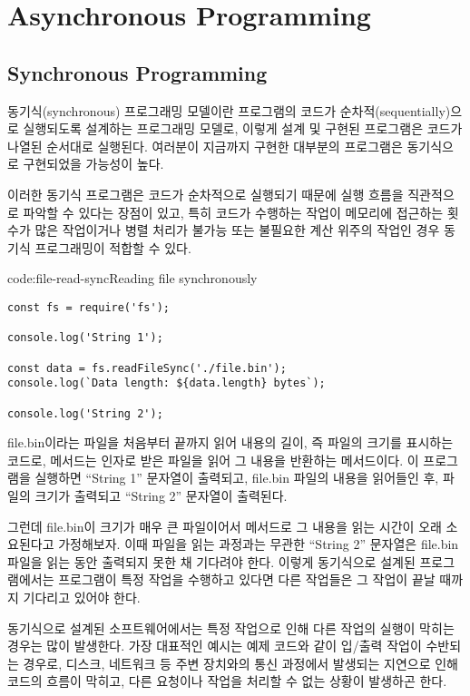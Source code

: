 \section{Asynchronous Programming}\label{sect:async-programming}

\subsection*{Synchronous Programming}

동기식(synchronous) 프로그래밍 모델이란 프로그램의 코드가 순차적(sequentially)으로 실행되도록 설계하는 프로그래밍 모델로, 이렇게 설계 및 구현된 프로그램은 코드가 나열된 순서대로 실행된다. 여러분이 지금까지 구현한 대부분의 프로그램은 동기식으로 구현되었을 가능성이 높다.

이러한 동기식 프로그램은 코드가 순차적으로 실행되기 때문에 실행 흐름을 직관적으로 파악할 수 있다는 장점이 있고, 특히 코드가 수행하는 작업이 메모리에 접근하는 횟수가 많은 작업이거나 병렬 처리가 불가능 또는 불필요한 계산 위주의 작업인 경우 동기식 프로그래밍이 적합할 수 있다.

\begin{code}{code:file-read-sync}{Reading file synchronously}
\begin{verbatim}
const fs = require('fs');

console.log('String 1');

const data = fs.readFileSync('./file.bin');
console.log(`Data length: ${data.length} bytes`);

console.log('String 2');
\end{verbatim}
\end{code}

\는 file.bin이라는 파일을 처음부터 끝까지 읽어 내용의 길이, 즉 파일의 크기를 표시하는 코드로,  메서드는 인자로 받은 파일을 읽어 그 내용을 반환하는 메서드이다. 이 프로그램을 실행하면 ``String 1'' 문자열이 출력되고, file.bin 파일의 내용을 읽어들인 후, 파일의 크기가 출력되고 ``String 2'' 문자열이 출력된다.

그런데 file.bin이 크기가 매우 큰 파일이어서  메서드로 그 내용을 읽는 시간이 오래 소요된다고 가정해보자. 이때 파일을 읽는 과정과는 무관한 ``String 2'' 문자열은 file.bin 파일을 읽는 동안 출력되지 못한 채 기다려야 한다. 이렇게 동기식으로 설계된 프로그램에서는 프로그램이 특정 작업을 수행하고 있다면 다른 작업들은 그 작업이 끝날 때까지 기다리고 있어야 한다.

동기식으로 설계된 소프트웨어에서는 특정 작업으로 인해 다른 작업의 실행이 막히는 경우는 많이 발생한다. 가장 대표적인 예시는 예제 코드와 같이 입/출력 작업이 수반되는 경우로, 디스크, 네트워크 등 주변 장치와의 통신 과정에서 발생되는 지연으로 인해 코드의 흐름이 막히고, 다른 요청이나 작업을 처리할 수 없는 상황이 발생하곤 한다.

